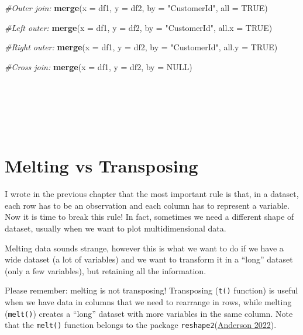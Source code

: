 \documentclass[
]{svmono}
\newenvironment{Shaded}{\begin{snugshade}}{\end{snugshade}}
\newcommand{\AttributeTok}[1]{\textcolor[rgb]{0.13,0.29,0.53}{#1}}
\newcommand{\CommentTok}[1]{\textcolor[rgb]{0.56,0.35,0.01}{\textit{#1}}}
\newcommand{\ConstantTok}[1]{\textcolor[rgb]{0.56,0.35,0.01}{#1}}
\newcommand{\FunctionTok}[1]{\textcolor[rgb]{0.13,0.29,0.53}{\textbf{#1}}}
\newcommand{\NormalTok}[1]{#1}
\newcommand{\StringTok}[1]{\textcolor[rgb]{0.31,0.60,0.02}{#1}}
\begin{document}
\begin{Shaded}
\begin{Highlighting}[]
\CommentTok{\#Outer join: }
\FunctionTok{merge}\NormalTok{(}\AttributeTok{x =}\NormalTok{ df1, }\AttributeTok{y =}\NormalTok{ df2, }\AttributeTok{by =} \StringTok{"CustomerId"}\NormalTok{, }\AttributeTok{all =} \ConstantTok{TRUE}\NormalTok{)}

\CommentTok{\#Left outer: }
\FunctionTok{merge}\NormalTok{(}\AttributeTok{x =}\NormalTok{ df1, }\AttributeTok{y =}\NormalTok{ df2, }\AttributeTok{by =} \StringTok{"CustomerId"}\NormalTok{, }\AttributeTok{all.x =} \ConstantTok{TRUE}\NormalTok{)}

\CommentTok{\#Right outer: }
\FunctionTok{merge}\NormalTok{(}\AttributeTok{x =}\NormalTok{ df1, }\AttributeTok{y =}\NormalTok{ df2, }\AttributeTok{by =} \StringTok{"CustomerId"}\NormalTok{, }\AttributeTok{all.y =} \ConstantTok{TRUE}\NormalTok{)}

\CommentTok{\#Cross join: }
\FunctionTok{merge}\NormalTok{(}\AttributeTok{x =}\NormalTok{ df1, }\AttributeTok{y =}\NormalTok{ df2, }\AttributeTok{by =} \ConstantTok{NULL}\NormalTok{)}
\end{Highlighting}
\end{Shaded}

~

~

~

\hypertarget{melting-vs-transposing}{%
\section{Melting vs Transposing}\label{melting-vs-transposing}}

I wrote in the previous chapter that the most important rule is that, in
a dataset, each row has to be an observation and each column has to
represent a variable. Now it is time to break this rule! In fact,
sometimes we need a different shape of dataset, usually when we want to
plot multidimensional data.

Melting data sounds strange, however this is what we want to do if we
have a wide dataset (a lot of variables) and we want to transform it in
a ``long'' dataset (only a few variables), but retaining all the
information.

Please remember: melting is not transposing! Transposing (\texttt{t()}
function) is useful when we have data in columns that we need to
rearrange in rows, while melting (\texttt{melt()}) creates a ``long'' dataset
with more variables in the same column. Note that the \texttt{melt()} function
belongs to the package \texttt{reshape2}(\protect\hyperlink{ref-anderson2022}{Anderson 2022}).
\end{document}
